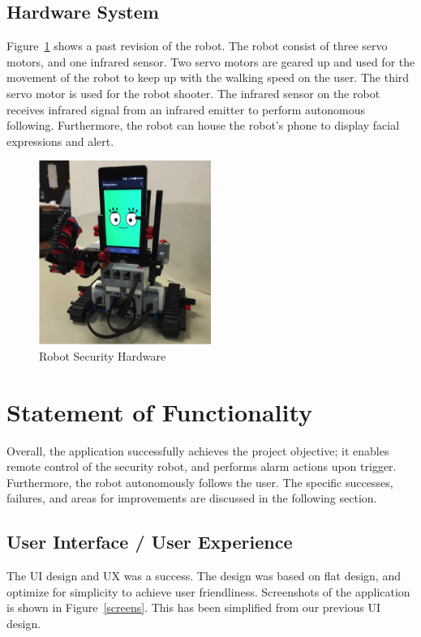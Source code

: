 \documentclass[12pt]{article}
\begin{document}
\subsection{Hardware System}
Figure~\ref{hardware} shows a past revision of the robot. The robot consist of three servo motors, and one infrared sensor. Two servo motors are geared up and used for the movement of the robot to keep up with the walking speed on the user. The third servo motor is used for the robot shooter. The infrared sensor on the robot receives infrared signal from an infrared emitter to perform autonomous following. Furthermore, the robot can house the robot's phone to display facial expressions and alert.

\begin{figure}[!htbp]
    \centering
    \includegraphics[width=0.5\textwidth]{hardware.png}
    \caption{Robot Security Hardware}
    \label{hardware}
\end{figure}

\section{Statement of Functionality}
Overall, the application successfully achieves the project objective; it enables remote control of the security robot, and performs alarm actions upon trigger. Furthermore, the robot autonomously follows the user. The specific successes, failures, and areas for improvements are discussed in the following section.

\subsection{User Interface / User Experience}
The UI design and UX was a success. The design was based on flat design, and optimize for simplicity to achieve user friendliness. Screenshots of the application is shown in Figure~\ref{screens}. This has been simplified from our previous UI design.
\end{document}
